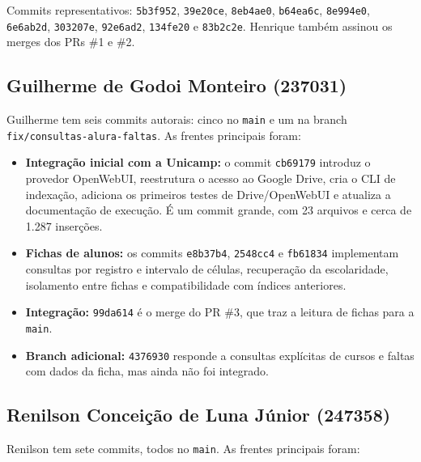 \documentclass[12pt,a4paper]{article}
\newcommand{\commit}[1]{\texttt{#1}}
\begin{document}
Commits representativos: \commit{5b3f952}, \commit{39e20ce}, \commit{8eb4ae0},
\commit{b64ea6c}, \commit{8e994e0}, \commit{6e6ab2d}, \commit{303207e},
\commit{92e6ad2}, \commit{134fe20} e \commit{83b2c2e}. Henrique também assinou os
merges dos PRs \#1 e \#2.

\subsection{Guilherme de Godoi Monteiro (237031)}

Guilherme tem seis commits autorais: cinco no \texttt{main} e um na branch
\texttt{fix/\allowbreak consultas-\allowbreak alura-\allowbreak faltas}. As frentes principais foram:

\begin{itemize}
  \item \textbf{Integração inicial com a Unicamp:} o commit \commit{cb69179}
        introduz o provedor OpenWebUI, reestrutura o acesso ao Google Drive, cria
        o CLI de indexação, adiciona os primeiros testes de Drive/OpenWebUI e
        atualiza a documentação de execução. É um commit grande, com 23 arquivos
        e cerca de 1.287 inserções.
  \item \textbf{Fichas de alunos:} os commits \commit{e8b37b4}, \commit{2548cc4}
        e \commit{fb61834} implementam consultas por registro e intervalo de
        células, recuperação da escolaridade, isolamento entre fichas e
        compatibilidade com índices anteriores.
  \item \textbf{Integração:} \commit{99da614} é o merge do PR \#3, que traz a
        leitura de fichas para a \texttt{main}.
  \item \textbf{Branch adicional:} \commit{4376930} responde a consultas
        explícitas de cursos e faltas com dados da ficha, mas ainda não foi
        integrado.
\end{itemize}

\subsection{Renilson Conceição de Luna Júnior (247358)}

Renilson tem sete commits, todos no \texttt{main}. As frentes principais foram:
\end{document}
